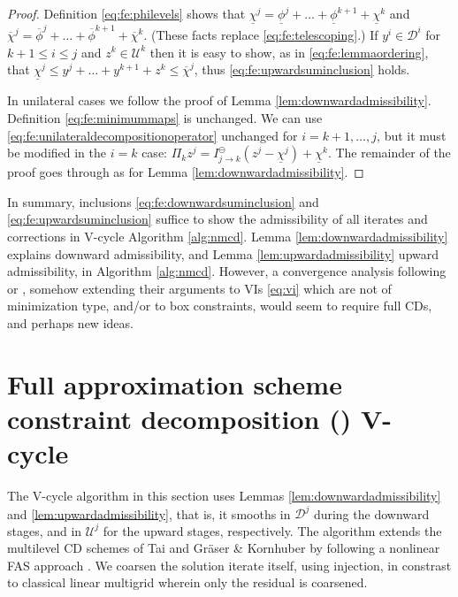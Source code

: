 \documentclass[letterpaper,final,12pt,reqno]{amsart}
\theoremstyle{cstyle}
\theoremstyle{cstyle*}
\theoremstyle{dstyle}
\numberwithin{equation}{section}
\numberwithin{figure}{section}
\numberwithin{table}{section}
\numberwithin{theorem}{section}
\begin{document}
\begin{proof}  Definition \eqref{eq:fe:philevels} shows that $\underline{\chi}^j = \underline{\phi}^j + \dots + \underline{\phi}^{k+1} + \underline{\chi}^k$ and $\overline{\chi}^j = \overline{\phi}^j + \dots + \overline{\phi}^{k+1} + \overline{\chi}^k$.  (These facts replace \eqref{eq:fe:telescoping}.)  If $y^i \in \mathcal{D}^i$ for $k+1 \le i \le j$ and $z^k \in \mathcal{U}^k$ then it is easy to show, as in \eqref{eq:fe:lemmaordering}, that $\underline{\chi}^j \le y^j + \dots + y^{k+1} + z^k \le \overline{\chi}^j$, thus \eqref{eq:fe:upwardsuminclusion} holds.

In unilateral cases we follow the proof of Lemma \ref{lem:downwardadmissibility}.  Definition \eqref{eq:fe:minimummaps} is unchanged.  We can use \eqref{eq:fe:unilateraldecompositionoperator} unchanged for $i=k+1,\dots,j$, but it must be modified in the $i=k$ case: $\Pi_k z^j = I_{j\to k}^\ominus(z^j - \underline{\chi}^j) + \underline{\chi}^k$.  The remainder of the proof goes through as for Lemma \ref{lem:downwardadmissibility}.
\end{proof}

In summary, inclusions \eqref{eq:fe:downwardsuminclusion} and \eqref{eq:fe:upwardsuminclusion} suffice to show the admissibility of all iterates and corrections in V-cycle Algorithm \ref{alg:nmcd}.  Lemma \ref{lem:downwardadmissibility} explains downward admissibility, and Lemma \ref{lem:upwardadmissibility} upward admissibility, in Algorithm \ref{alg:nmcd}.  However, a convergence analysis following \cite{Tai2003} or \cite{GraeserKornhuber2009}, somehow extending their arguments to VIs \eqref{eq:vi} which are not of minimization type, and/or to box constraints, would seem to require full CDs, and perhaps new ideas.


\newcommand{\fascd}{\pr{fascd}\xspace}

\section{Full approximation scheme constraint decomposition (\fascd) V-cycle} \label{sec:vcycle}

The \fascd V-cycle algorithm in this section uses Lemmas \ref{lem:downwardadmissibility} and \ref{lem:upwardadmissibility}, that is, it smooths in $\mathcal{D}^j$ during the downward stages, and in $\mathcal{U}^j$ for the upward stages, respectively.  The algorithm extends the multilevel CD schemes of Tai \cite{Tai2003} and Gr\"aser \& Kornhuber \cite[Algorithm 4.7]{GraeserKornhuber2009} by following a nonlinear FAS approach \cite{BrandtLivne2011}.  We coarsen the solution iterate itself, using injection, in constrast to classical linear multigrid wherein only the residual is coarsened.
\end{document}
